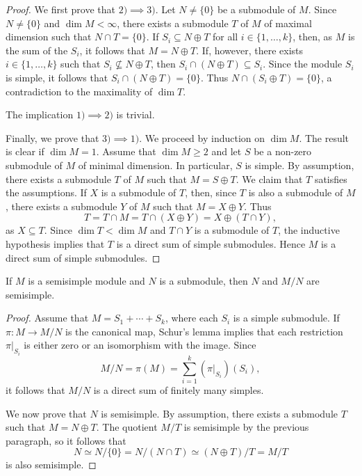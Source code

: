 \begin{proof}
	We first prove that $2)\implies3)$.
	Let $N\ne\{0\}$ be a submodule of $M$. Since $N\ne\{0\}$ and $\dim M<\infty$, there exists a submodule 
	$T$ of $M$ of maximal dimension such that 
	$N\cap T=\{0\}$. If $S_i\subseteq N\oplus T$ for all $i\in\{1,\dots,k\}$, then, as $M$ is the sum of the $S_i$, it follows that
	$M=N\oplus T$. 
	If, however, there exists $i\in\{1,\dots,k\}$ such that $S_i\not\subseteq N\oplus T$, then $S_i\cap (N\oplus T)\subseteq S_i$. 
	Since the module $S_i$ is simple,
	it follows that $S_i\cap (N\oplus T)=\{0\}$. Thus $N\cap (S_i\oplus T)=\{0\}$, a contradiction to the maximality of
	$\dim T$.  
	
	The implication  $1)\implies2)$ is trivial. 
	
	Finally, we prove that $3)\implies1)$. 
	We proceed by induction on $\dim M$. The result is clear if $\dim M=1$. Assume that $\dim M\geq2$ and   
	let $S$ be a non-zero submodule of $M$ of minimal dimension. In particular, $S$ is simple. 
    By assumption, there exists a submodule $T$ of $M$ such that $M=S\oplus T$. We claim that $T$ satisfies the assumptions. 
	If $X$ is a submodule of $T$, then, since $T$ is also a submodule of $M$, there exists a submodule $Y$ of $M$ such that 
	$M=X\oplus Y$. Thus  
	\[
	T=T\cap M=T\cap (X\oplus Y)=X\oplus (T\cap Y),
	\]
	as $X\subseteq T$. 
	Since $\dim T<\dim M$ and $T\cap Y$ is a submodule of $T$, the inductive hypothesis implies 
	that $T$ is a direct sum of simple submodules. Hence $M$ is a direct sum of simple submodules. 
\end{proof}

\begin{proposition}
    If $M$ is a semisimple module and $N$ is a submodule, then $N$ and $M/N$ are semisimple.	
\end{proposition}

\begin{proof}
	Assume that $M=S_1+\cdots+ S_k$, where each $S_i$ is a simple submodule. If $\pi\colon M\to M/N$ 
	is the canonical map, Schur's lemma implies that each restriction $\pi|_{S_i}$ 
	is either zero or an isomorphism with the image. Since  
	\[
	M/N=\pi(M)=\sum_{i=1}^k(\pi|_{S_i})(S_i),
	\]
	it follows that $M/N$ is a direct sum of finitely many simples. 
	
	We now prove that $N$ is semisimple. By assumption, 
	there exists a submodule $T$ such that 
	$M=N\oplus T$. The quotient
	$M/T$ is semisimple by the previous paragraph, so it follows that 
	\[
	N\simeq N/\{0\}=N/(N\cap T)\simeq (N\oplus T)/T=M/T
	\]
	is also semisimple.     
\end{proof}

